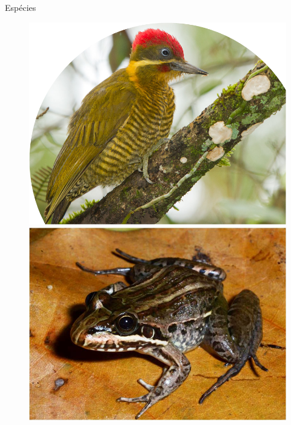 \documentclass{beamer}
\begin{document}
\begin{frame}{Espécies}
\begin{figure}[!h]
  	      \includegraphics[scale=0.25]{PP1.png}\quad
  	      \includegraphics[scale=0.3]{ra.jpg}
          \label{Rotulo}
        \end{figure}
    \end{frame}
    
\end{document}
